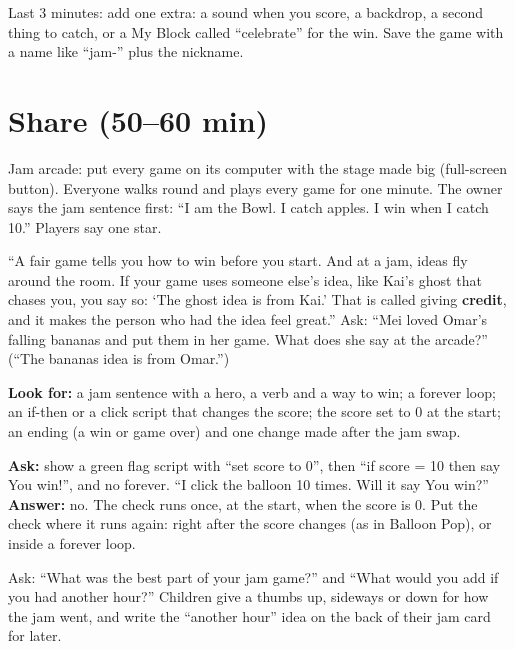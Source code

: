 \begin{freebuild}
Last 3 minutes: add one extra: a sound when you score, a backdrop, a second thing to catch, or a My Block called \enquote{celebrate} for the win. Save the game with a name like \enquote{jam-} plus the nickname.
\end{freebuild}

\section{Share (50--60 min)}
\begin{teacherscript}
Jam arcade: put every game on its computer with the stage made big (full-screen button). Everyone walks round and plays every game for one minute. The owner says the jam sentence first: \enquote{I am the Bowl. I catch apples. I win when I catch 10.} Players say one star.
\end{teacherscript}

\begin{safety}
\enquote{A fair game tells you how to win before you start. And at a jam, ideas fly around the room. If your game uses someone else's idea, like Kai's ghost that chases you, you say so: \enquote{The ghost idea is from Kai.} That is called giving \textbf{credit}, and it makes the person who had the idea feel great.} Ask: \enquote{Mei loved Omar's falling bananas and put them in her game. What does she say at the arcade?} (\enquote{The bananas idea is from Omar.})
\end{safety}

\begin{formativecheck}
\textbf{Look for:} a jam sentence with a hero, a verb and a way to win; a forever loop; an if-then or a click script that changes the score; the score set to 0 at the start; an ending (a win or game over) and one change made after the jam swap.

\textbf{Ask:} show a green flag script with \enquote{set score to 0}, then \enquote{if score = 10 then say You win!}, and no forever. \enquote{I click the balloon 10 times. Will it say You win?}
\textbf{Answer:} no. The check runs once, at the start, when the score is 0. Put the check where it runs again: right after the score changes (as in Balloon Pop), or inside a forever loop.
\end{formativecheck}

\begin{reflection}
Ask: \enquote{What was the best part of your jam game?} and \enquote{What would you add if you had another hour?} Children give a thumbs up, sideways or down for how the jam went, and write the \enquote{another hour} idea on the back of their jam card for later.
\end{reflection}

